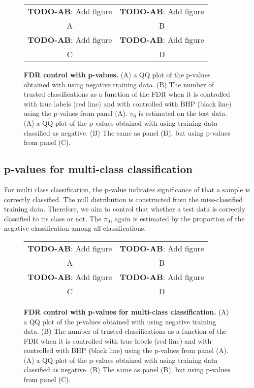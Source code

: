 \documentclass{article}
\newcommand{\todo}[2]{{\color{red} {\bf TODO-#1}: #2}}
\begin{document}
\begin{figure}
	\centering
	\begin{tabular}{cc}
		\todo{AB}{Add figure} &
		\todo{AB}{Add figure} \\
		A & B \\
		\todo{AB}{Add figure} &
		\todo{AB}{Add figure} \\
		C & D \\
	\end{tabular}
	\caption{{\bf FDR control with p-values.}
		(A) a QQ plot of the p-values obtained with using negative training data. (B) The number of trusted classifications as a function of the FDR when it is controlled with true labels (red line) and with controlled with BHP (black line) using the p-values from panel (A). $\pi_0$ is estimated on the test data.
		(A) a QQ plot of the p-values obtained with using training data classified as negative. (B) The same as panel (B), but using p-values from panel (C).
	}
	\label{fig:examples}
\end{figure}



\subsection{p-values for multi-class classification}

For multi class classification, the p-value indicates significance of that a sample is correctly classified. The null distribution is constructed from the miss-classified training data. Therefore, we aim to control that whether a test data is correctly classified to its class or not. The $\pi_0$, again is estimated by the proportion of the negative classification among all classifications.



\begin{figure}
	\centering
	\begin{tabular}{cc}
		\todo{AB}{Add figure} &
		\todo{AB}{Add figure} \\
		A & B \\
		\todo{AB}{Add figure} &
		\todo{AB}{Add figure} \\
		C & D \\
	\end{tabular}
	\caption{{\bf FDR control with p-values for multi-class classification.}
		(A) a QQ plot of the p-values obtained with using negative training data. (B) The number of trusted classifications as a function of the FDR when it is controlled with true labels (red line) and with controlled with BHP (black line) using the p-values from panel (A).
		(A) a QQ plot of the p-values obtained with using training data classified as negative. (B) The same as panel (B), but using p-values from panel (C).
	}
	\label{fig:examples}
\end{figure}
\end{document}
